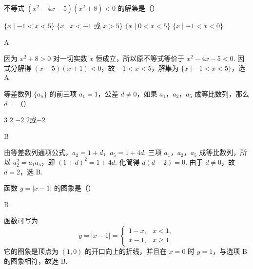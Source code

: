 \documentclass[UTF8,a4paper,oneside,11pt]{ctexbook}
\begin{document}
\begin{problem}
不等式 \((x^2-4x-5)(x^2+8)<0\) 的解集是（\quad）

\choices
    {\(\{x\mid -1<x<5\}\)}
    {\(\{x\mid x<-1\text{\ 或\ }x>5\}\)}
    {\(\{x\mid 0<x<5\}\)}
    {\(\{x\mid -1<x<0\}\)}
\end{problem}

\begin{answer}
A
\end{answer}

\begin{solution}
因为 \(x^2+8>0\) 对一切实数 \(x\) 恒成立，所以原不等式等价于 \(x^2-4x-5<0\). 因式分解得 \((x-5)(x+1)<0\)，故 \(-1<x<5\)，解集为 \(\{x\mid-1<x<5\}\)，选 A.
\end{solution}

\begin{problem}
等差数列 \(\{a_n\}\) 的前三项 \(a_1=1\)，公差 \(d\neq0\)，如果 \(a_1\)，\(a_2\)，\(a_5\) 成等比数列，那么 \(d=\)（\quad）

\choices
    {\(3\)}
    {\(2\)}
    {\(-2\)}
    {\(2\)或\(-2\)}
\end{problem}

\begin{answer}
B
\end{answer}

\begin{solution}
由等差数列通项公式，\(a_2=1+d\)，\(a_5=1+4d\). 三项 \(a_1\)，\(a_2\)，\(a_5\) 成等比数列，所以 \(a_2^2=a_1a_5\)，即 \((1+d)^2=1+4d\). 化简得 \(d(d-2)=0\). 由于 \(d\neq0\)，故 \(d=2\)，选 B.
\end{solution}

\begin{problem}
函数 \(y=|x-1|\) 的图象是（\quad）

\choices
    {}
    {}
    {}
    {}
\end{problem}

\begin{answer}
B
\end{answer}

\begin{solution}
函数可写为
\[
y=|x-1|=\begin{cases}
1-x,&x<1,\\
x-1,&x\geqslant1.
\end{cases}
\]
它的图象是顶点为 \((1,0)\) 的开口向上的折线，并且在 \(x=0\) 时 \(y=1\)，与选项 B 的图象相符，故选 B.
\end{solution}
\end{document}
